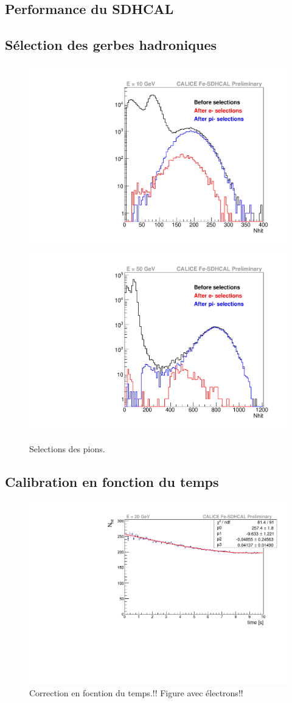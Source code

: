 \subsection{Performance du SDHCAL}
\label{sec.muons}

\subsection{Sélection des gerbes hadroniques}
\begin{figure}[!h]
  \begin{center}
    \includegraphics[width=.45\textwidth]{SDHCAL/figs/selection715693.pdf}
    \includegraphics[width=.45\textwidth]{SDHCAL/figs/selection715751.pdf}
    \caption{Selections des pions.}
    \label{fig:pion_selection}
  \end{center}
\end{figure}

\subsection{Calibration en fonction du temps}
\begin{figure}[!h]
  \begin{center}
    \includegraphics[width=.7\textwidth]{SDHCAL/figs/timeFit.pdf}
    \caption{Correction en focntion du temps.!! Figure avec électrons!!}
    \label{fig:time_correction}
  \end{center}
\end{figure}

